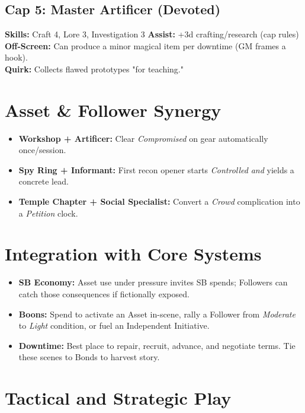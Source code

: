 \subsection*{Cap 5: Master Artificer (Devoted)}
\textbf{Skills:} Craft 4, Lore 3, Investigation 3 \quad
\textbf{Assist:} +3d crafting/research (cap rules) \\
\textbf{Off-Screen:} Can produce a minor magical item per downtime (GM frames a hook). \\
\textbf{Quirk:} Collects flawed prototypes "for teaching."

\section{Asset \& Follower Synergy}
\begin{itemize}
  \item \textbf{Workshop + Artificer:} Clear \emph{Compromised} on gear automatically once/session.
  \item \textbf{Spy Ring + Informant:} First recon opener starts \emph{Controlled} \emph{and} yields a concrete lead.
  \item \textbf{Temple Chapter + Social Specialist:} Convert a \emph{Crowd} complication into a \emph{Petition} clock.
\end{itemize}

\section{Integration with Core Systems}
\begin{itemize}
  \item \textbf{SB Economy:} Asset use under pressure invites SB spends; Followers can catch those consequences if fictionally exposed.
  \item \textbf{Boons:} Spend to activate an Asset in-scene, rally a Follower from \emph{Moderate} to \emph{Light} condition, or fuel an Independent Initiative.
  \item \textbf{Downtime:} Best place to repair, recruit, advance, and negotiate terms. Tie these scenes to Bonds to harvest story.
\end{itemize}

\section{Tactical and Strategic Play}
